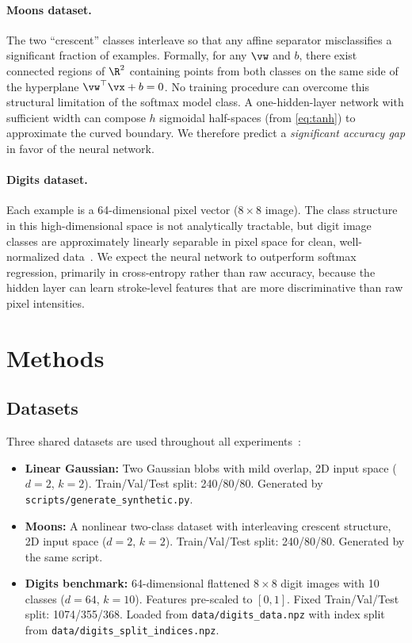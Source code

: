 \documentclass[sigconf,screen,nonacm]{acmart}
\begin{document}
\paragraph{Moons dataset.}
The two ``crescent'' classes interleave so that any affine separator misclassifies a significant fraction of examples. Formally, for any $\vw$ and $b$, there exist connected regions of $\R^2$ containing points from both classes on the same side of the hyperplane $\vw^\top\vx + b = 0$. No training procedure can overcome this structural limitation of the softmax model class. A one-hidden-layer network with sufficient width can compose $h$ sigmoidal half-spaces (from \cref{eq:tanh}) to approximate the curved boundary. We therefore predict a \emph{significant accuracy gap} in favor of the neural network.

\paragraph{Digits dataset.}
Each example is a 64-dimensional pixel vector ($8 \times 8$ image). The class structure in this high-dimensional space is not analytically tractable, but digit image classes are approximately linearly separable in pixel space for clean, well-normalized data~\cite{goodfellow2016deep}. We expect the neural network to outperform softmax regression, primarily in cross-entropy rather than raw accuracy, because the hidden layer can learn stroke-level features that are more discriminative than raw pixel intensities.

\section{Methods}

\subsection{Datasets}
\label{sec:datasets}

Three shared datasets are used throughout all experiments~\cite{eth_intro_ml}:
\begin{itemize}[leftmargin=*]
    \item \textbf{Linear Gaussian:} Two Gaussian blobs with mild overlap, 2D input space ($d{=}2$, $k{=}2$). Train/Val/Test split: 240/80/80. Generated by \texttt{scripts/generate\_synthetic.py}.
    \item \textbf{Moons:} A nonlinear two-class dataset with interleaving crescent structure, 2D input space ($d{=}2$, $k{=}2$). Train/Val/Test split: 240/80/80. Generated by the same script.
    \item \textbf{Digits benchmark:} 64-dimensional flattened $8 \times 8$ digit images with 10 classes ($d{=}64$, $k{=}10$). Features pre-scaled to $[0, 1]$. Fixed Train/Val/Test split: 1074/355/368. Loaded from \texttt{data/digits\_data.npz} with index split from \texttt{data/digits\_split\_indices.npz}.
\end{itemize}
\end{document}
